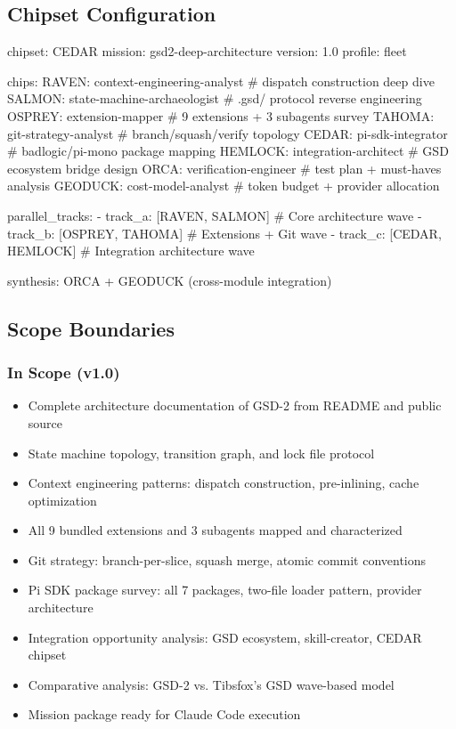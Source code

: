 \documentclass[11pt,letterpaper]{article}
\begin{document}
\subsection{Chipset Configuration}

\begin{asciibox}
chipset: CEDAR
mission: gsd2-deep-architecture
version: 1.0
profile: fleet

chips:
  RAVEN:    context-engineering-analyst     # dispatch construction deep dive
  SALMON:   state-machine-archaeologist     # .gsd/ protocol reverse engineering
  OSPREY:   extension-mapper               # 9 extensions + 3 subagents survey
  TAHOMA:   git-strategy-analyst           # branch/squash/verify topology
  CEDAR:    pi-sdk-integrator              # badlogic/pi-mono package mapping
  HEMLOCK:  integration-architect          # GSD ecosystem bridge design
  ORCA:     verification-engineer          # test plan + must-haves analysis
  GEODUCK:  cost-model-analyst             # token budget + provider allocation

parallel_tracks:
  - track_a: [RAVEN, SALMON]     # Core architecture wave
  - track_b: [OSPREY, TAHOMA]    # Extensions + Git wave
  - track_c: [CEDAR, HEMLOCK]    # Integration architecture wave

synthesis: ORCA + GEODUCK (cross-module integration)
\end{asciibox}

\subsection{Scope Boundaries}

\subsubsection{In Scope (v1.0)}

\begin{itemize}
  \item Complete architecture documentation of GSD-2 from README and public source
  \item State machine topology, transition graph, and lock file protocol
  \item Context engineering patterns: dispatch construction, pre-inlining, cache optimization
  \item All 9 bundled extensions and 3 subagents mapped and characterized
  \item Git strategy: branch-per-slice, squash merge, atomic commit conventions
  \item Pi SDK package survey: all 7 packages, two-file loader pattern, provider architecture
  \item Integration opportunity analysis: GSD ecosystem, skill-creator, CEDAR chipset
  \item Comparative analysis: GSD-2 vs. Tibsfox's GSD wave-based model
  \item Mission package ready for Claude Code execution
\end{itemize}
\end{document}
